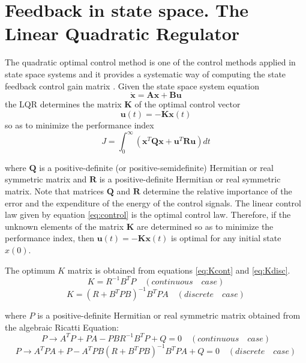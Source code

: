 \section{Feedback in state space. The Linear Quadratic Regulator}

The quadratic optimal control method is one of the control methods applied in state space systems and it provides a systematic way of computing the state feedback control gain matrix \cite{Ogata}.
Given the state space system equation
\begin{equation}
\mathbf{\dot{x}} = \mathbf{A}\textbf{x} + \mathbf{B}\mathbf{u}
\end{equation}
the LQR determines the matrix $\mathbf{K}$ of the optimal control vector
\begin{equation}
\mathbf{u}(t) = -\mathbf{Kx}(t)
\label{eq:control}
\end{equation}
so as to minimize the performance index
\begin{equation}
J = \int_{0}^{\infty}(\mathbf{x}^{T}\mathbf{Qx}+\mathbf{u}^{T}\mathbf{Ru}) dt
\end{equation}

where $\mathbf{Q}$ is a positive-definite (or positive-semidefinite) Hermitian or real symmetric matrix and $\mathbf{R}$ is a positive-definite Hermitian or real symmetric matrix. Note that matrices $\mathbf{Q}$ and $\mathbf{R}$ determine the relative importance of the error and the expenditure of the energy of the control signals.
The linear control law given by equation \eqref{eq:control} is the optimal control law. Therefore, if the unknown elements of the matrix $\mathbf{K}$ are determined so as to minimize the performance index, then $\mathbf{u}(t) = -\mathbf{Kx}(t)$  is optimal for any initial state $x(0)$. 

The optimum $K$ matrix is obtained from equations \ref{eq:Kcont} and \ref{eq:Kdisc}.
\begin{equation}
K = R^{-1}B^{T}P \quad (continuous \quad case)
\label{eq:Kcont}
\end{equation}
\begin{equation}
K = (R + B^{T}PB)^{-1}B^{T}PA \quad (discrete \quad case)
\label{eq:Kdisc}
\end{equation}

where $P$ is a positive-definite Hermitian or real symmetric matrix obtained from the algebraic Ricatti Equation:
\begin{equation}
P \rightarrow A^{T}P+PA-PBR^{-1}B^{T}P+Q = 0 \quad (continuous \quad case)
\end{equation}
\begin{equation}
P \rightarrow A^{T}PA+P-A^{T}PB(R+B^{T}PB)^{-1}B^{T}PA+Q = 0 \quad (discrete \quad case)
\end{equation}



